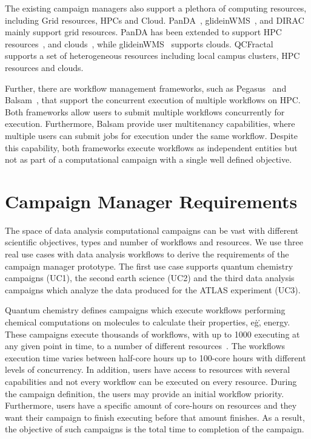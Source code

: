 The existing campaign managers also support a plethora of computing resources, including Grid resources, HPCs and Cloud.
PanDA~\cite{maeno2008panda}, glideinWMS~\cite{sfiligoi2008glidein}, and DIRAC~\cite{casajus2010dirac} mainly support grid resources.
PanDA has been extended to support HPC resources~\cite{de2015future, de2016accelerating}, and clouds~\cite{de2016accelerating}, while glideinWMS~\cite{sfiligoi2008glidein} supports clouds.
QCFractal~\cite{qcfractal} supports a set of heterogeneous resources including local campus clusters, HPC resources and clouds.

Further, there are workflow management frameworks, such as Pegasus~\cite{deelman2015pegasus} and Balsam~\cite{salim2019balsam}, that support the concurrent execution of multiple workflows on HPC.
Both frameworks allow users to submit multiple workflows concurrently for execution.
Furthermore, Balsam provide user multitenancy capabilities, where multiple users can submit jobs for execution under the same workflow.
Despite this capability, both frameworks execute workflows as independent entities but not as part of a computational campaign with a single well defined objective.

\section{Campaign Manager Requirements}
\label{sec:cm_req}

The space of data analysis computational campaigns can be vast with different scientific objectives, types and number of workflows and resources.
We use three real use cases with data analysis workflows to derive the requirements of the campaign manager prototype.
The first use case supports quantum chemistry campaigns (UC1), the second earth science (UC2) and the third data analysis campaigns which analyze the data produced for the ATLAS experiment (UC3).

Quantum chemistry defines campaigns which execute workflows performing chemical computations on molecules to calculate their properties, e\.g\., energy.
These campaigns execute thousands of workflows, with up to 1000 executing at any given point in time, to a number of different resources~\cite{smith2020molssi}.
The workflows execution time varies between half-core hours up to 100-core hours with different levels of concurrency.
In addition, users have access to resources with several capabilities and not every workflow can be executed on every resource.
During the campaign definition, the users may provide an initial workflow priority.
Furthermore, users have a specific amount of core-hours on resources and they want their campaign to finish executing before that amount finishes.
As a result, the objective of such campaigns is the total time to completion of the campaign.

